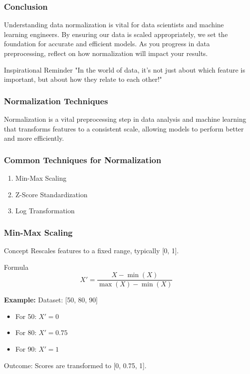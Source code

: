 \documentclass[aspectratio=169]{beamer}
\begin{document}
\begin{frame}[fragile]
    \frametitle{Conclusion}
    Understanding data normalization is vital for data scientists and machine learning engineers. By ensuring our data is scaled appropriately, we set the foundation for accurate and efficient models. 
    As you progress in data preprocessing, reflect on how normalization will impact your results.
    \begin{block}{Inspirational Reminder}
        "In the world of data, it's not just about which feature is important, but about how they relate to each other!"
    \end{block}
\end{frame}

\begin{frame}[fragile]
    \frametitle{Normalization Techniques}
    Normalization is a vital preprocessing step in data analysis and machine learning that transforms features to a consistent scale, allowing models to perform better and more efficiently.
\end{frame}

\begin{frame}[fragile]
    \frametitle{Common Techniques for Normalization}
    \begin{enumerate}
        \item Min-Max Scaling
        \item Z-Score Standardization
        \item Log Transformation
    \end{enumerate}
\end{frame}

\begin{frame}[fragile]
    \frametitle{Min-Max Scaling}
    \begin{block}{Concept}
        Rescales features to a fixed range, typically [0, 1].
    \end{block}
    \begin{block}{Formula}
        \[
        X' = \frac{X - \min(X)}{\max(X) - \min(X)}
        \]
    \end{block}
    \begin{example}
        \textbf{Example:} 
        Dataset: [50, 80, 90]
        \begin{itemize}
            \item For 50: \( X' = 0 \)
            \item For 80: \( X' = 0.75 \)
            \item For 90: \( X' = 1 \)
        \end{itemize}
        Outcome: Scores are transformed to [0, 0.75, 1].
    \end{example}
\end{frame}
\end{document}
